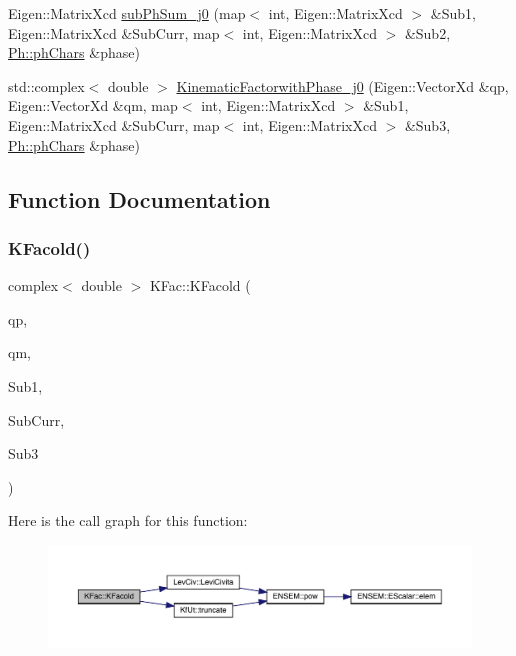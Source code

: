 \begin{DoxyCompactItemize}
\item 
Eigen\+::\+Matrix\+Xcd \mbox{\hyperlink{namespaceKFac_abb86856b8424632f8f879408ce2cc05b}{sub\+Ph\+Sum\+\_\+j0}} (map$<$ int, Eigen\+::\+Matrix\+Xcd $>$ \&Sub1, Eigen\+::\+Matrix\+Xcd \&Sub\+Curr, map$<$ int, Eigen\+::\+Matrix\+Xcd $>$ \&Sub2, \mbox{\hyperlink{structPh_1_1phChars}{Ph\+::ph\+Chars}} \&phase)
\item 
std\+::complex$<$ double $>$ \mbox{\hyperlink{namespaceKFac_a8a20f176fbf91758f8699734b8df3f04}{Kinematic\+Factorwith\+Phase\+\_\+j0}} (Eigen\+::\+Vector\+Xd \&qp, Eigen\+::\+Vector\+Xd \&qm, map$<$ int, Eigen\+::\+Matrix\+Xcd $>$ \&Sub1, Eigen\+::\+Matrix\+Xcd \&Sub\+Curr, map$<$ int, Eigen\+::\+Matrix\+Xcd $>$ \&Sub3, \mbox{\hyperlink{structPh_1_1phChars}{Ph\+::ph\+Chars}} \&phase)
\end{DoxyCompactItemize}


\subsection{Function Documentation}
\mbox{\label{namespaceKFac_a3226cfdfe24c39b0713ca6ede04de295}} 
\subsubsection{\texorpdfstring{KFacold()}{KFacold()}}
{\footnotesize\ttfamily complex$<$ double $>$ K\+Fac\+::\+K\+Facold (\begin{DoxyParamCaption}\item[{Eigen\+::\+Vector\+Xd \&}]{qp,  }\item[{Eigen\+::\+Vector\+Xd \&}]{qm,  }\item[{Eigen\+::\+Matrix\+Xcd \&}]{Sub1,  }\item[{Eigen\+::\+Matrix\+Xcd \&}]{Sub\+Curr,  }\item[{Eigen\+::\+Matrix\+Xcd \&}]{Sub3 }\end{DoxyParamCaption})}

Here is the call graph for this function\+:
\nopagebreak
\begin{figure}[H]
\begin{center}
\leavevmode
\includegraphics[width=350pt]{d2/d89/namespaceKFac_a3226cfdfe24c39b0713ca6ede04de295_cgraph}
\end{center}
\end{figure}
\mbox{\label{namespaceKFac_a4cb65a4089c62e25d5511e2711fed59d}} 
